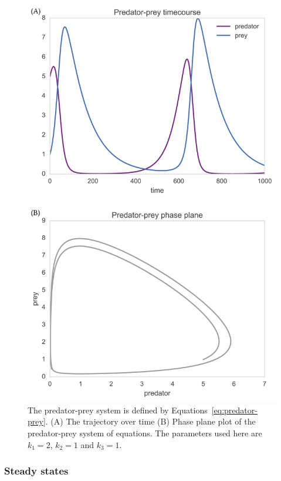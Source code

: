 \begin{figure}[htb]
\centerfloat
    \includegraphics[scale=0.7]{../../chapters/chapterBackgr/images/phas_plane_example.png}
    \caption[Phase plane analysis]{The predator-prey system is defined by Equations~\ref{eq:predator-prey}. (A) The trajectory over time (B) Phase plane plot of the predator-prey system of equations. The parameters used here are $k_1=2$, $k_2=1$ and $k_3=1$.}
    \label{fig:pp_phase}
\end{figure}

\subsubsection{Steady states}

